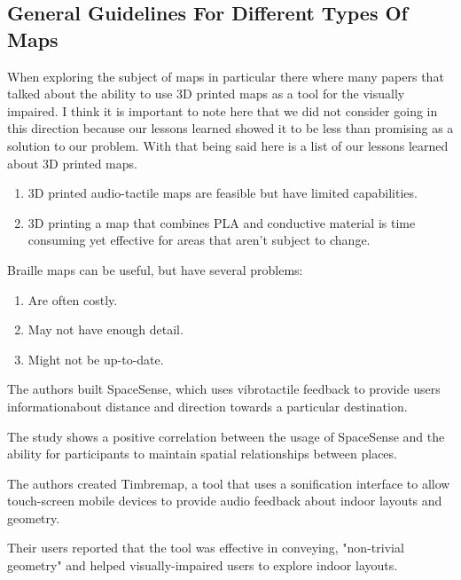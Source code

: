 \documentclass{article}
\begin{document}
\subsection{General Guidelines For Different Types Of Maps}
When exploring the subject of maps in particular there where many papers that talked about the ability to use 3D printed maps as a tool for the visually impaired. I think it is important to note here that we did not consider going in this direction because our lessons learned showed it to be less than promising as a solution to our problem. With that being said here is a list of our lessons learned about 3D printed maps.
\newline
\cite{10.1007/978-3-319-41267-2_20}
\begin{enumerate}
    \item 3D printed audio-tactile maps are feasible but have limited capabilities. 
    \item 3D printing a map that combines PLA and conductive material is time consuming yet effective for areas that aren't subject to change. 
\end{enumerate}
\cite{10.1145/2207676.2207734}
Braille maps can be useful, but have several problems:
\begin{enumerate}
    \item Are often costly.
    \item May not have enough detail.
    \item Might not be up-to-date.
\end{enumerate}

The authors built SpaceSense, which uses vibrotactile feedback to provide users informationabout distance and direction towards a particular destination.
\newline
\par The study shows a positive correlation between the usage of SpaceSense and the ability for participants to maintain spatial relationships between places.


\cite{10.1145/1851600.1851606}
\par The authors created Timbremap, a tool that uses a sonification interface to allow touch-screen mobile devices to provide audio feedback about indoor layouts and geometry.
\newline
\par Their users reported that the tool was effective in conveying, "non-trivial geometry" and helped visually-impaired users to explore indoor layouts.
\newline
\end{document}
